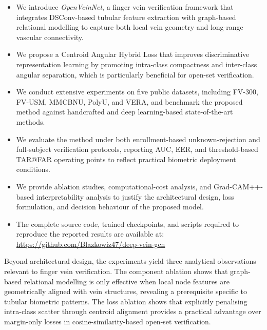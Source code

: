 \documentclass[10pt,journal,compsoc]{IEEEtran}
\begin{document}
\begin{itemize}
    \item We introduce \emph{OpenVeinNet}, a finger vein verification framework that integrates DSConv-based tubular feature extraction with graph-based relational modelling to capture both local vein geometry and long-range vascular connectivity.
    \item We propose a Centroid Angular Hybrid Loss that improves discriminative representation learning by promoting intra-class compactness and inter-class angular separation, which is particularly beneficial for open-set verification.
    \item We conduct extensive experiments on five public datasets, including FV-300, FV-USM, MMCBNU, PolyU, and VERA, and benchmark the proposed method against handcrafted and deep learning-based state-of-the-art methods.
    \item We evaluate the method under both enrollment-based unknown-rejection and full-subject verification protocols, reporting AUC, EER, and threshold-based TAR@FAR operating points to reflect practical biometric deployment conditions.
    \item We provide ablation studies, computational-cost analysis, and Grad-CAM++-based interpretability analysis to justify the architectural design, loss formulation, and decision behaviour of the proposed model.
    \item The complete source code, trained checkpoints, and scripts required to reproduce the reported results are available at:
    \url{https://github.com/Blazkowiz47/deep-vein-gcn}
\end{itemize}

\noindent Beyond architectural design, the experiments yield three
analytical observations relevant to finger vein verification.
The component ablation shows that graph-based relational modelling
is only effective when local node features are geometrically aligned
with vein structures, revealing a prerequisite specific to tubular
biometric patterns. The loss ablation shows that explicitly penalising intra-class scatter through centroid alignment provides a practical advantage over margin-only losses in cosine-similarity-based open-set
verification.
\end{document}
